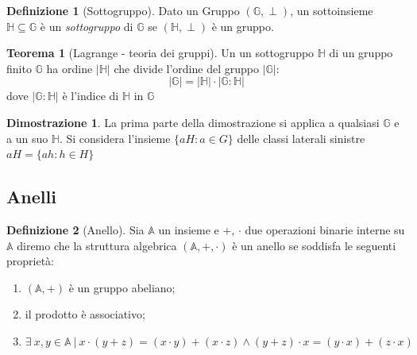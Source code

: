 \documentclass{book}
\theoremstyle{definition}
\newtheorem{definizione}{Definizione}
\newtheorem{teorema}{Teorema}
\newtheorem{dimostrazione}{Dimostrazione}
\newcommand{\Gr}{\mathbb{G}}
\newcommand{\SGr}{\mathbb{H}}
\newcommand{\An}{\mathbb{A}}
\newcommand{\per}{\cdot}
\begin{document}
\medskip
\begin{definizione}[Sottogruppo]
    Dato un Gruppo $(\Gr, \perp)$, un sottoinsieme $\SGr \subseteq \Gr$ è un \emph{sottogruppo} di $\Gr$ se $(\SGr, \perp)$ è un gruppo.
\end{definizione}

\medskip
\begin{teorema}[Lagrange - teoria dei gruppi]
    Un un sottogruppo $\SGr$ di un gruppo finito $\Gr$ ha ordine $|\SGr|$ che divide l'ordine del gruppo $|\Gr|$:
    \[
        |\Gr| = |\SGr| \cdot |\Gr : \SGr|
    \]
    dove $|\Gr : \SGr|$ è l'indice di $\SGr$ in $\Gr$
\end{teorema}

\medskip
\begin{dimostrazione}
    La prima parte della dimostrazione si applica a qualsiasi $\Gr$ e a un suo $\SGr$. 
    Si considera l'insieme $\{ a H : a \in G \}$ delle classi laterali sinistre $aH=\{ ah : h \in H \}$
\end{dimostrazione}

\subsection{Anelli}

\begin{definizione}[Anello]
    Sia $\An$ un insieme e $+$, $\per$ due operazioni binarie interne su $\An$ 
    diremo che la struttura algebrica $(\An, +, \per)$ è un anello se soddisfa le seguenti proprietà:
    \begin{enumerate}[label=(A\arabic*.),itemindent=*]
        \item $(\An, +)$ è un gruppo abeliano;
        \item il prodotto è associativo;
        \item $\exists \ x, y \in \An \ | \ x \per ( y + z ) = (x \per y) + (x \per z) \land ( y + z ) \per x = ( y \per x ) + (z \per x )$
    \end{enumerate}
\end{definizione}

\medskip
\end{document}
